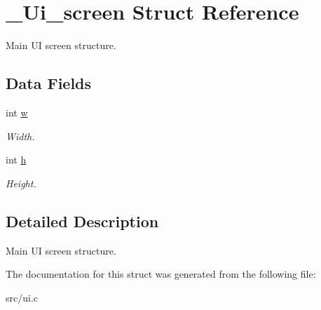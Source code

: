 \hypertarget{struct__Ui__screen}{}\section{\+\_\+\+Ui\+\_\+screen Struct Reference}
\label{struct__Ui__screen}


Main UI screen structure.  


\subsection*{Data Fields}
\begin{DoxyCompactItemize}
\item 
\mbox{\label{struct__Ui__screen_a0d1d60ef32f78df18ce4f7ac8b97e5ea}} 
int \hyperlink{struct__Ui__screen_a0d1d60ef32f78df18ce4f7ac8b97e5ea}{w}
\begin{DoxyCompactList}\small\item\em Width. \end{DoxyCompactList}\item 
\mbox{\label{struct__Ui__screen_ad16a11cf58cfd3423e7b5e9b2fa184e3}} 
int \hyperlink{struct__Ui__screen_ad16a11cf58cfd3423e7b5e9b2fa184e3}{h}
\begin{DoxyCompactList}\small\item\em Height. \end{DoxyCompactList}\end{DoxyCompactItemize}


\subsection{Detailed Description}
Main UI screen structure. 

The documentation for this struct was generated from the following file\+:\begin{DoxyCompactItemize}
\item 
src/ui.\+c\end{DoxyCompactItemize}
